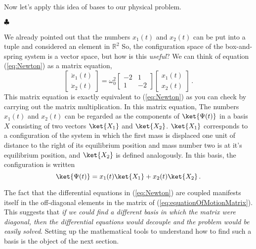 Now let's apply this idea of bases to our physical problem.
\begin{flushleft} $\clubsuit$ \end{flushleft}
We already pointed out that the numbers $x_1(t)$ and $x_2(t)$ can be put into a tuple and considered an element in $\mathbb{R}^2$
So, the configuration space of the box-and-spring system is a vector space, but how is this \emph{useful}?
We can think of equation (\ref{eq:Newton}) as a matrix equation,
\begin{equation} \label{eq:equationOfMotionMatrix}
\left[ \begin{array}{c} \ddot{x}_1(t) \\ \ddot{x}_2(t) \end{array} \right] = \omega^{2}_{0}\left[ \begin{array}{cc} -2 & 1 \\ 1 & -2 \end{array} \right] \left[ \begin{array}{c} x_{1}(t) \\ x_{2}(t) \end{array} \right] \, .
\end{equation}
This matrix equation is exactly equivalent to (\ref{eq:Newton}) as you can check by carrying out the matrix multiplication.
In this matrix equation, The numbers $x_1(t)$ and $x_2(t)$ can be regarded as the components of $\ket{\Psi (t)}$ in a basis $X$ consisting of two vectors $\ket{X_1}$ and $\ket{X_2}$.
$\ket{X_1}$ corresponds to a configuration of the system in which the first mass is displaced one unit of distance to the right of its equilibrium position and mass number two is at it's equilibrium position, and $\ket{X_2}$ is defined analogously.
In this basis, the configuration is written
\begin{equation} \label{eq:Psirep2}
\ket{\Psi (t)} = x_{1}(t)\ket{X_1} + x_{2}(t)\ket{X_2} \, .
\end{equation}

The fact that the differential equations in (\ref{eq:Newton}) are coupled manifests itself in the off-diagonal elements in the matrix of (\ref{eq:equationOfMotionMatrix}).
This suggests that \emph{if we could find a different basis in which the matrix were diagonal, then the differential equations would decouple and the problem would be easily solved}.
Setting up the mathematical tools to understand how to find such a basis is the object of the next section.

